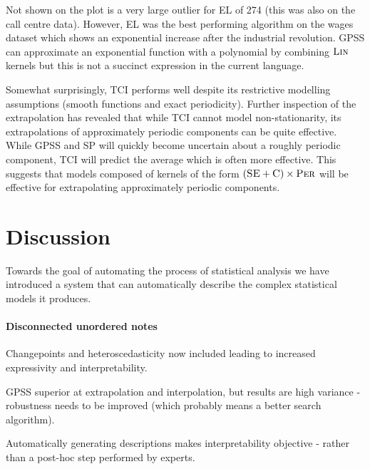 \documentclass{article}
\begin{document}
Not shown on the plot is a very large outlier for EL of 274 (this was also on the call centre data).
However, EL was the best performing algorithm on the wages dataset which shows an exponential increase after the industrial revolution.
GPSS can approximate an exponential function with a polynomial by combining ${\textsc{Lin}}$ kernels but this is not a succinct expression in the current language.

Somewhat surprisingly, TCI performs well despite its restrictive modelling assumptions (smooth functions and exact periodicity).
Further inspection of the extrapolation has revealed that while TCI cannot model non-stationarity, its extrapolations of approximately periodic components can be quite effective.
While GPSS and SP will quickly become uncertain about a roughly periodic component, TCI will predict the average which is often more effective.
This suggests that models composed of kernels of the form $({\textsc{SE}} + {\textsc{C}}) \times {\textsc{Per}}$ will be effective for extrapolating approximately periodic components.

\section{Discussion}


Towards the goal of automating the process of statistical analysis we have introduced a system that can automatically describe the complex statistical models it produces.

\paragraph{Disconnected unordered notes}

Changepoints and heteroscedasticity now included leading to increased expressivity and interpretability.

GPSS superior at extrapolation and interpolation, but results are high variance - robustness needs to be improved (which probably means a better search algorithm).

Automatically generating descriptions makes interpretability objective - rather than a post-hoc step performed by experts.
\end{document}
